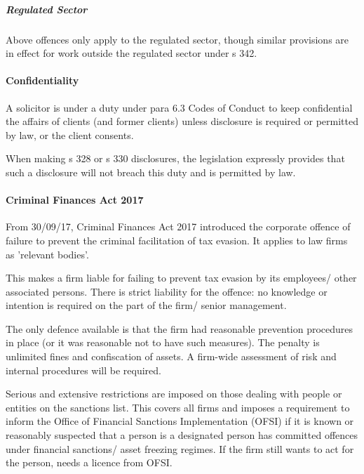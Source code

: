 \documentclass[
]{article}
\begin{document}
\hypertarget{regulated-sector}{%
\subparagraph{Regulated Sector}\label{regulated-sector}}

Above offences only apply to the regulated sector, though similar
provisions are in effect for work outside the regulated sector under s
342.

\hypertarget{confidentiality-1}{%
\paragraph{Confidentiality}\label{confidentiality-1}}

A solicitor is under a duty under para 6.3 Codes of Conduct to keep
confidential the affairs of clients (and former clients) unless
disclosure is required or permitted by law, or the client consents.

When making s 328 or s 330 disclosures, the legislation expressly
provides that such a disclosure will not breach this duty and is
permitted by law.

\hypertarget{criminal-finances-act-2017}{%
\paragraph{Criminal Finances Act
2017}\label{criminal-finances-act-2017}}

From 30/09/17, Criminal Finances Act 2017 introduced the corporate
offence of failure to prevent the criminal facilitation of tax evasion.
It applies to law firms as 'relevant bodies'.

This makes a firm liable for failing to prevent tax evasion by its
employees/ other associated persons. There is strict liability for the
offence: no knowledge or intention is required on the part of the firm/
senior management.

The only defence available is that the firm had reasonable prevention
procedures in place (or it was reasonable not to have such measures).
The penalty is unlimited fines and confiscation of assets. A firm-wide
assessment of risk and internal procedures will be required.

Serious and extensive restrictions are imposed on those dealing with
people or entities on the sanctions list. This covers all firms and
imposes a requirement to inform the Office of Financial Sanctions
Implementation (OFSI) if it is known or reasonably suspected that a
person is a designated person has committed offences under financial
sanctions/ asset freezing regimes. If the firm still wants to act for
the person, needs a licence from OFSI.
\end{document}
